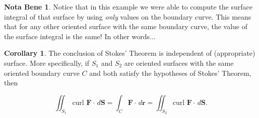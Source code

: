 \documentclass[11pt,oneside,english]{amsart}
\theoremstyle{definition}
\newtheorem{corollary}{Corollary}
\newtheorem*{note}{Nota Bene}
\begin{document}
\begin{note}
Notice that in this example we were able to compute the surface integral of that surface by using \textit{only} values on the boundary curve. This means that for any other oriented surface with the same boundary curve, the value of the surface integral is the same! In other words...
\end{note}

\begin{corollary}
The conclusion of Stokes' Theorem is independent of (appropriate) surface. More specifically, if $S_1$ and $S_2$ are oriented surfaces with the same oriented boundary curve $C$ and both satisfy the hypotheses of Stokes' Theorem, then

\[
\iint_{S_1}\text{curl }\mathbf{F}\cdot\,d\mathbf{S}=\int_C\mathbf{F}\cdot\,d\mathbf{r}=\iint_{S_2}\text{curl }\mathbf{F}\cdot\,d\mathbf{S}.
\]
\end{corollary}
\end{document}
